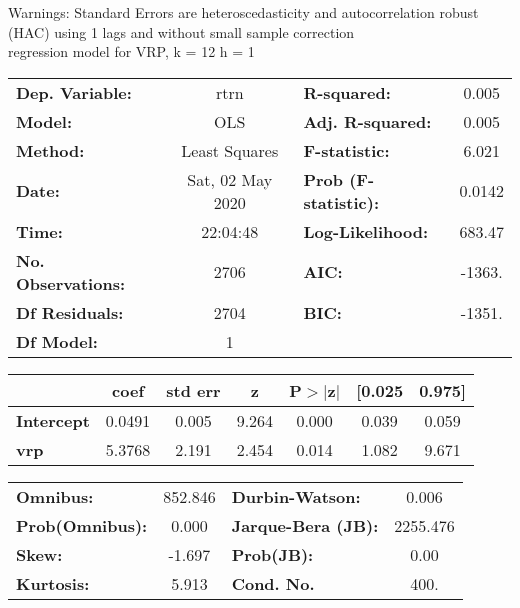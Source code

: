 Warnings: \newline
 [1] Standard Errors are heteroscedasticity and autocorrelation robust (HAC) using 1 lags and without small sample correction\\ 

regression model for VRP, k = 12 h = 1\begin{center}
\begin{tabular}{lclc}
\toprule
\textbf{Dep. Variable:}    &       rtrn       & \textbf{  R-squared:         } &     0.005   \\
\textbf{Model:}            &       OLS        & \textbf{  Adj. R-squared:    } &     0.005   \\
\textbf{Method:}           &  Least Squares   & \textbf{  F-statistic:       } &     6.021   \\
\textbf{Date:}             & Sat, 02 May 2020 & \textbf{  Prob (F-statistic):} &   0.0142    \\
\textbf{Time:}             &     22:04:48     & \textbf{  Log-Likelihood:    } &    683.47   \\
\textbf{No. Observations:} &        2706      & \textbf{  AIC:               } &    -1363.   \\
\textbf{Df Residuals:}     &        2704      & \textbf{  BIC:               } &    -1351.   \\
\textbf{Df Model:}         &           1      & \textbf{                     } &             \\
\bottomrule
\end{tabular}
\begin{tabular}{lcccccc}
                   & \textbf{coef} & \textbf{std err} & \textbf{z} & \textbf{P$> |$z$|$} & \textbf{[0.025} & \textbf{0.975]}  \\
\midrule
\textbf{Intercept} &       0.0491  &        0.005     &     9.264  &         0.000        &        0.039    &        0.059     \\
\textbf{vrp}       &       5.3768  &        2.191     &     2.454  &         0.014        &        1.082    &        9.671     \\
\bottomrule
\end{tabular}
\begin{tabular}{lclc}
\textbf{Omnibus:}       & 852.846 & \textbf{  Durbin-Watson:     } &    0.006  \\
\textbf{Prob(Omnibus):} &   0.000 & \textbf{  Jarque-Bera (JB):  } & 2255.476  \\
\textbf{Skew:}          &  -1.697 & \textbf{  Prob(JB):          } &     0.00  \\
\textbf{Kurtosis:}      &   5.913 & \textbf{  Cond. No.          } &     400.  \\
\bottomrule
\end{tabular}
\end{center}

